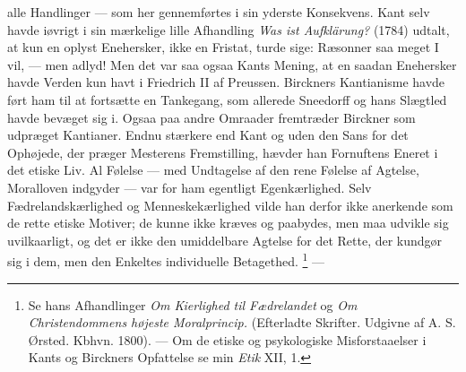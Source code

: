 \documentclass[12pt,a4paper,openany]{book}
\newcommand{\opage}[1]{\marginnote{\footnotesize\textit{[#1]}}}
\begin{document}
alle Handlinger --- som her gennemførtes i sin yderste Konsekvens. Kant selv
havde iøvrigt i sin mærkelige lille Afhandling \textit{Was ist
Aufkl}\textit{ä}\textit{rung?} (1784) udtalt, at kun en oplyst Enehersker, ikke
en Fristat, turde sige: Ræsonner saa meget I vil, --- men adlyd! Men det var
saa ogsaa Kants Mening, at en saadan Enehersker havde Verden kun havt i
Friedrich II af Preussen. Birckners Kantianisme havde ført ham til at fortsætte
en Tankegang, som allerede Sneedorff og hans Slægtled havde
\setcounter{footnote}{0}%
\opage{29}bevæget sig i. Ogsaa paa andre Omraader fremtræder Birckner som
udpræget Kantianer. Endnu stærkere end Kant og uden den Sans for det Ophøjede,
der præger Mesterens Fremstilling, hævder han Fornuftens Eneret i det etiske
Liv. Al Følelse --- med Undtagelse af den rene Følelse af Agtelse, Moralloven
indgyder --- var for ham egentligt Egenkærlighed. Selv Fædrelandskærlighed og
Menneskekærlighed vilde han derfor ikke anerkende som de rette etiske Motiver;
de kunne ikke kræves og paabydes, men maa udvikle sig uvilkaarligt, og det er
ikke den umiddelbare Agtelse for det Rette, der kundgør sig i dem, men den
Enkeltes individuelle Betagethed.%
\footnote[1]{Se hans Afhandlinger \textit{Om Kierlighed til Fædrelandet} og
\textit{Om Christendommens højeste Moralprincip.} (Efterladte Skrifter. Udgivne
af A. S. Ørsted. Kbhvn. 1800). --- Om de etiske og psykologiske Misforstaaelser
i Kants og Birckners Opfattelse se min \textit{Etik} XII, 1.} ---
\end{document}
